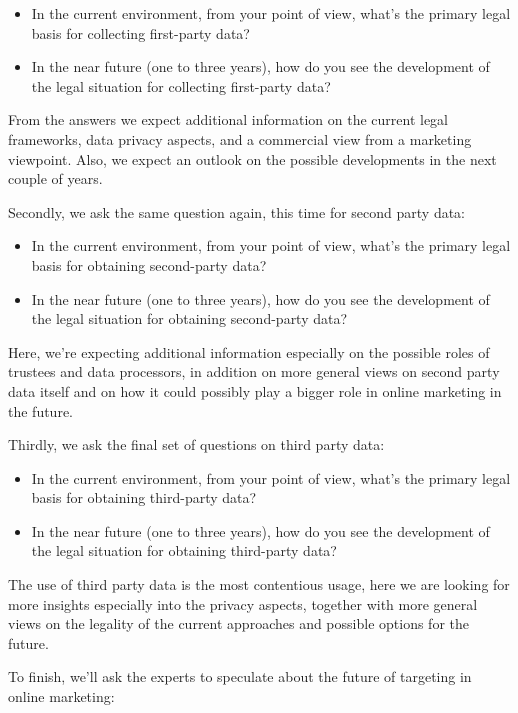 \begin{itemize}
 \item In the current environment, from your point of view, what's the primary legal basis for collecting first-party data?
 \item In the near future (one to three years), how do you see the development of the legal situation for collecting first-party data?
\end{itemize}
 
From the answers we expect additional information on the current legal frameworks, data privacy aspects, and a commercial view from a marketing viewpoint. Also, we expect an outlook on the possible developments in the next couple of years.
 
Secondly, we ask the same question again, this time for second party data:

\begin{itemize} 
 \item In the current environment, from your point of view, what's the primary legal basis for obtaining second-party data?
 \item In the near future (one to three years), how do you see the development of the legal situation for obtaining second-party data?
\end{itemize}

Here, we're expecting additional information especially on the possible roles of trustees and data processors, in addition on more general views on second party data itself and on how it could possibly play a bigger role in online marketing in the future.
 
Thirdly, we ask the final set of questions on third party data:

\begin{itemize} 
 \item In the current environment, from your point of view, what's the primary legal basis for obtaining third-party data?
 \item In the near future (one to three years), how do you see the development of the legal situation for obtaining third-party data?
\end{itemize} 
 
The use of third party data is the most contentious usage, here we are looking for more insights especially into the privacy aspects, together with more general views on the legality of the current approaches and possible options for the future.

To finish, we'll ask the experts to speculate about the future of targeting in online marketing:
 
